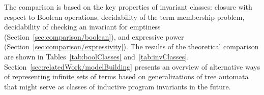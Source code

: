 The comparison is based on the key properties of invariant classes: closure with respect to Boolean operations, decidability of the term membership problem, decidability of checking an invariant for emptiness (Section~\cref{sec:comparison/boolean}), and expressive power (Section~\cref{sec:comparison/expressivity}).
The results of the theoretical comparison are shown in Tables~\cref{tab:boolClasses} and~\cref{tab:invClasses}.
Section~\cref{sec:relatedWork/modelBuilding} presents an overview of alternative ways of representing infinite sets of terms based on generalizations of tree automata that might serve as classes of inductive program invariants in the future.


